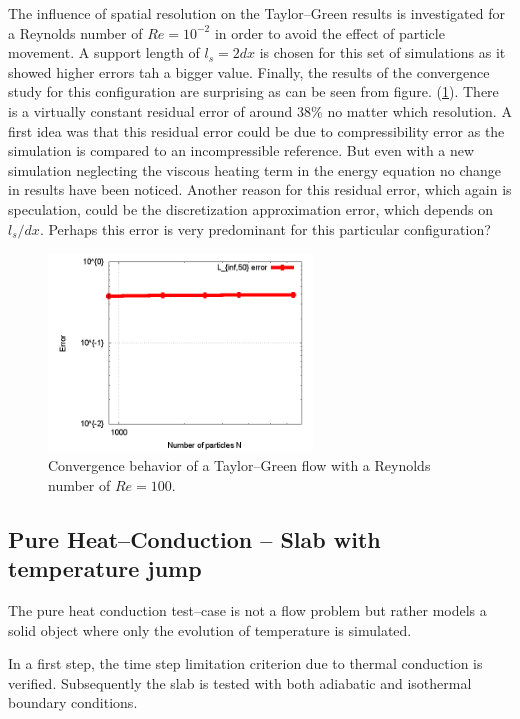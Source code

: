 \documentclass{report}
\begin{document}
The influence of spatial resolution on the Taylor--Green results is investigated for a Reynolds number of $Re=10^{-2}$ in order to avoid the effect of particle movement. A support length of $l_s=2dx$ is chosen for this set of simulations as it showed higher errors tah a bigger value. Finally, the results of the convergence study for this configuration are surprising as can be seen from figure. (\ref{fig:Results_TG_Resolution}). There is a virtually constant residual error of around $38\%$ no matter which resolution. A first idea was that this residual error could be due to compressibility error as the simulation is compared to an incompressible reference. But even with a new simulation neglecting the viscous heating term in the energy equation no change in results have been noticed. Another reason for this residual error, which again is speculation, could be the discretization approximation error, which depends on $l_s/dx$. Perhaps this error is very predominant for this particular configuration? 


\begin{figure}[h]
 \label{fig:Results_TG_Resolution}
\centering
\includegraphics[width=7cm]{Graphics/results/TaylorGreen/Eta_100_suplen2dx_ResStudy/ErrorResolution}
\caption[Convergence Taylor--Green]{Convergence behavior of a Taylor--Green flow with a Reynolds number of $Re=100$.}
\end{figure}


\subsection{Pure Heat--Conduction  -- Slab with temperature jump}

The pure heat conduction test--case is not a flow problem but rather models a solid object where only the evolution of temperature is simulated. 

In a first step, the time step limitation criterion due to thermal conduction is verified. Subsequently the slab is tested with both adiabatic and isothermal boundary conditions. 
\end{document}
